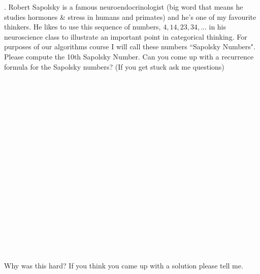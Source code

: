 \documentclass[12pt]{article}
\begin{document}
. Robert Sapolsky is a famous neuroendocrinologist (big word that means he studies hormones \& stress in humans and primates) and he's one of my favourite thinkers. He likes to use this sequence of numbers, $4, 14, 23, 34, \dots$ in his neuroscience class to illustrate an important point in categorical thinking. For purposes of our algorithms course I will call these numbers ``Sapolsky Numbers". Please compute the 10th Sapolsky Number. Can you come up with a recurrence formula for the Sapolsky numbers? (If you get stuck ask me questions)\\\\\\\\\\\\\\\\\\\\\\\\\\\\\\\\\\\\\\\\
Why was this hard? If you think you came up with a solution please tell me. 
\end{document}
